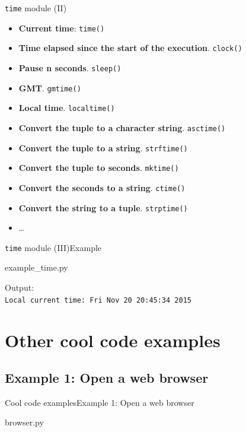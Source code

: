 \documentclass[10pt,compress]{beamer} %
\begin{document}
\begin{frame}{\texttt{time} module (II)}

\begin{block}{}
\footnotesize{
\begin{itemize}			
\item \textbf{Current time}: \texttt{time()}
\item \textbf{Time elapsed since the start of the execution}. \texttt{clock()}
\item \textbf{Pause n seconds}. \texttt{sleep()}
\item \textbf{GMT}. \texttt{gmtime()}
\item \textbf{Local time}. \texttt{localtime()}
\item \textbf{Convert the tuple to a character string}. \texttt{asctime()}
\item \textbf{Convert the tuple to a string}. \texttt{strftime()}
\item \textbf{Convert the tuple to seconds}. \texttt{mktime()}
\item \textbf{Convert the seconds to a string}. \texttt{ctime()}
\item \textbf{Convert the string to a tuple}. \texttt{strptime()}
\item \ldots
\end{itemize}
}
\end{block}	
\end{frame}

\begin{frame}{\texttt{time} module (III)}{Example}

\vspace{-0.2cm}
	\begin{block}{example\_time.py}

	

	\end{block}
Output:\\
\small{\texttt{Local current time: Fri Nov 20 20:45:34 2015}}
\end{frame}



\section{Other cool code examples}

\subsection{Example 1: Open a web browser}
\begin{frame}{Cool code examples}{Example 1: Open a web browser}
	\vspace{-0.2cm}
	\begin{block}{browser.py}
	\vspace{-0.2cm}
	
	\vspace{-0.2cm}
	\end{block}
\end{frame}
\end{document}
